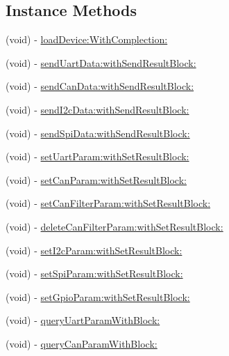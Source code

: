 \subsection*{Instance Methods}
\begin{DoxyCompactItemize}
\item 
(void) -\/ \hyperlink{interface_p_v_mount_a5438d85f833e406cf1c536aef3261022}{load\+Device\+:\+With\+Complection\+:}
\item 
(void) -\/ \hyperlink{interface_p_v_mount_a926fa710d91412bedb7dbb32a68e42bf}{send\+Uart\+Data\+:with\+Send\+Result\+Block\+:}
\item 
(void) -\/ \hyperlink{interface_p_v_mount_a91446ecdf826731976b137f032fdd9d6}{send\+Can\+Data\+:with\+Send\+Result\+Block\+:}
\item 
(void) -\/ \hyperlink{interface_p_v_mount_a01e42f8ec2b5dab140fd886fa5e0e362}{send\+I2c\+Data\+:with\+Send\+Result\+Block\+:}
\item 
(void) -\/ \hyperlink{interface_p_v_mount_a9157df82e088d45c7a453683dfdf0001}{send\+Spi\+Data\+:with\+Send\+Result\+Block\+:}
\item 
(void) -\/ \hyperlink{interface_p_v_mount_a578e957011559369a1448b7c9fd1b963}{set\+Uart\+Param\+:with\+Set\+Result\+Block\+:}
\item 
(void) -\/ \hyperlink{interface_p_v_mount_a2ab76320ecdec4fd52974349ca6cd6f0}{set\+Can\+Param\+:with\+Set\+Result\+Block\+:}
\item 
(void) -\/ \hyperlink{interface_p_v_mount_ab8227c3a907e87e5b4deb5e2f9151ac0}{set\+Can\+Filter\+Param\+:with\+Set\+Result\+Block\+:}
\item 
(void) -\/ \hyperlink{interface_p_v_mount_a08a223bd5b4daab480c8755d5ef17975}{delete\+Can\+Filter\+Param\+:with\+Set\+Result\+Block\+:}
\item 
(void) -\/ \hyperlink{interface_p_v_mount_ad45731021d189dfb946481c4fb575792}{set\+I2c\+Param\+:with\+Set\+Result\+Block\+:}
\item 
(void) -\/ \hyperlink{interface_p_v_mount_a17df266112343fd8d0f992002a09a3f4}{set\+Spi\+Param\+:with\+Set\+Result\+Block\+:}
\item 
(void) -\/ \hyperlink{interface_p_v_mount_a0f4ec792225f7ec44f258825d4382953}{set\+Gpio\+Param\+:with\+Set\+Result\+Block\+:}
\item 
(void) -\/ \hyperlink{interface_p_v_mount_ad7007122c7d77395ce7c5761f3de07c4}{query\+Uart\+Param\+With\+Block\+:}
\item 
(void) -\/ \hyperlink{interface_p_v_mount_a239b470716dbb17b1a10326cceaf186f}{query\+Can\+Param\+With\+Block\+:}

\end{DoxyCompactItemize}
